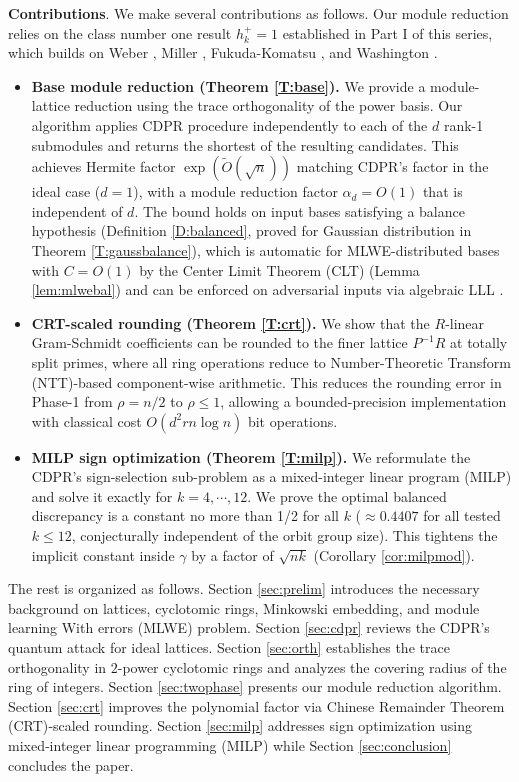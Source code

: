 \documentclass[11pt,a4paper]{article}
\theoremstyle{plain}
\theoremstyle{definition}
\theoremstyle{remark}
\newcommand{\tO}{\tilde{O}}
\begin{document}
\textbf{Contributions}. We make several contributions as follows. Our module reduction relies on the class number one result $h_k^+=1$ established in Part I of this series, which builds on Weber \cite{Weber1886}, Miller \cite{Miller14}, Fukuda-Komatsu \cite{FK09,FK11}, and Washington \cite{Wash97}.
\begin{itemize}
\item \textbf{Base module reduction (Theorem \ref{T:base}).}
    We provide a module-lattice reduction using the trace orthogonality of the power basis. Our algorithm applies CDPR procedure independently to each of the $d$ rank-1 submodules and returns the shortest of the resulting candidates. This achieves Hermite factor $\exp(\tO(\sqrt n))$ matching CDPR's factor in the ideal case ($d=1$), with a module reduction factor $\alpha_d=O(1)$ that is independent of $d$. The bound holds on input bases satisfying a balance hypothesis (Definition \ref{D:balanced}, proved for Gaussian distribution in Theorem \ref{T:gaussbalance}), which is automatic for MLWE-distributed bases with $C=O(1)$ by the Center Limit Theorem (CLT) (Lemma \ref{lem:mlwebal}) and can be enforced on adversarial inputs via algebraic LLL \cite{LLPS19,KEF20}. 
    
  \item \textbf{CRT-scaled rounding (Theorem \ref{T:crt}).}
    We show that the $R$-linear Gram-Schmidt coefficients can be rounded to the finer lattice $P^{-1}R$ at totally split primes, where all ring operations reduce to Number-Theoretic Transform (NTT)-based component-wise arithmetic. This reduces the rounding error in Phase-1 from $\rho=n/2$ to $\rho\le 1$, allowing a bounded-precision implementation with classical cost $O(d^2 r n\log n)$ bit operations.

 \item \textbf{MILP sign optimization (Theorem \ref{T:milp}).} We reformulate the CDPR's sign-selection sub-problem as a mixed-integer linear program (MILP) and solve it exactly for $k=4, \cdots, 12$. We prove the optimal balanced discrepancy is a constant no more than 1/2 for all $k$ ($\approx 0.4407$ for all tested $k\le 12$, conjecturally independent of the orbit group size). This tightens the implicit constant inside $\gamma$ by a factor of $\sqrt{nk}$ (Corollary \ref{cor:milpmod}).
\end{itemize}

The rest is organized as follows. Section \ref{sec:prelim} introduces the necessary background on lattices, cyclotomic rings, Minkowski embedding, and module learning With errors (MLWE) problem. Section \ref{sec:cdpr} reviews the CDPR's quantum attack for ideal lattices. Section \ref{sec:orth} establishes the trace orthogonality in $2$-power cyclotomic rings and analyzes the covering radius of the ring of integers. Section \ref{sec:twophase} presents our module reduction algorithm. Section \ref{sec:crt} improves the polynomial factor via Chinese Remainder Theorem (CRT)‑scaled rounding. Section \ref{sec:milp} addresses sign optimization using mixed‑integer linear programming (MILP) while Section \ref{sec:conclusion} concludes the paper.
\end{document}

